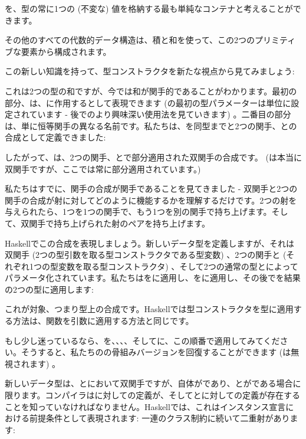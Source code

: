 
を、型の常に1つの (不変な) 値を格納する最も単純なコンテナと考えることができます。

その他のすべての代数的データ構造は、積と和を使って、この2つのプリミティブな要素から構成されます。

この新しい知識を持って、型コンストラクタを新たな視点から見てみましょう: 

これは2つの型の和ですが、今では和が関手的であることがわかります。最初の部分、は、に作用するとして表現できます (の最初の型パラメーターは単位に設定されています - 後でのより興味深い使用法を見ていきます) 。二番目の部分は、単に恒等関手の異なる名前です。私たちは、を同型までと2つの関手、との合成として定義できました: 

したがって、は、2つの関手、とで部分適用された双関手の合成です。 (は本当に双関手ですが、ここでは常に部分適用されています。) 

私たちはすでに、関手の合成が関手であることを見てきました - 双関手と2つの関手の合成が射に対してどのように機能するかを理解するだけです。2つの射を与えられたら、1つを1つの関手で、もう1つを別の関手で持ち上げます。そして、双関手で持ち上げられた射のペアを持ち上げます。

Haskellでこの合成を表現しましょう。新しいデータ型を定義しますが、それは双関手 (2つの型引数を取る型コンストラクタである型変数) 、2つの関手と (それぞれ1つの型変数を取る型コンストラクタ) 、そして2つの通常の型とによってパラメータ化されています。私たちはをに適用し、をに適用し、その後でを結果の2つの型に適用します: 

これが対象、つまり型上の合成です。Haskellでは型コンストラクタを型に適用する方法は、関数を引数に適用する方法と同じです。

もし少し迷っているなら、を、、、、そしてに、この順番で適用してみてください。そうすると、私たちのの骨組みバージョンを回復することができます (は無視されます) 。

新しいデータ型は、とにおいて双関手ですが、自体がであり、とがである場合に限ります。コンパイラはに対しての定義が、そしてとに対しての定義が存在することを知っていなければなりません。Haskellでは、これはインスタンス宣言における前提条件として表現されます: 一連のクラス制約に続いて二重射があります: 

